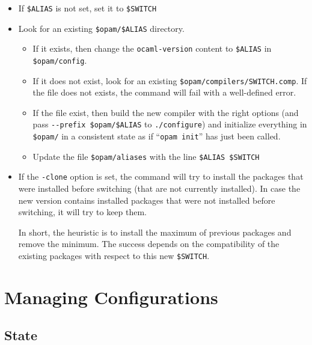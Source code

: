 \documentclass[a4paper,11pt]{article}
\begin{document}
\begin{itemize}

\item If \verb+$ALIAS+ is not set, set it to \verb+$SWITCH+

\item Look for an existing \verb+$opam/$ALIAS+ directory.

\begin{itemize}
\item If it
  exists, then change the {\tt ocaml-version} content to
  \verb+$ALIAS+ in  \verb+$opam/config+.

\item If it does not exist, look for an existing
  \verb+$opam/compilers/SWITCH.comp+. If the file does not exists,
  the command will fail with a well-defined error.

\item If the file exist, then build the new compiler with the right
  options (and pass \verb+--prefix $opam/$ALIAS+ to
  \verb+./configure+) and initialize everything in \verb+$opam/+
  in a consistent state as if ``\verb+opam init+'' has just been called.

\item Update the file \verb+$opam/aliases+ with the line
  \verb+$ALIAS $SWITCH+

\end{itemize}

\item If the \verb+-clone+ option is set, the command will try to install
  the packages that were installed before switching
  (that are not currently installed).
  In case the new version contains installed packages
  that were not installed before switching, it will try to keep them.

  In short, the heuristic is to install the maximum of previous packages
  and remove the minimum.
  The success depends on the compatibility of the existing packages
  with respect to this new \verb+$SWITCH+.

\end{itemize}

\section{Managing Configurations}
\label{section:config}

\subsection{State}
\end{document}
